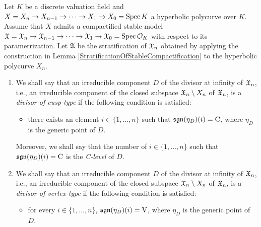 \begin{defn}
  Let $K$ be a discrete valuation field and $X = X_n \to X_{n - 1} \to \cdots \to X_1 \to X_0 = \mathrm{Spec} \, K$ a hyperbolic polycurve over $K$. Assume that $X$ admits a compactified stable model $\mathfrak{X} = \mathfrak{X}_n \to \mathfrak{X}_{n - 1} \to \cdots \to \mathfrak{X}_1 \to \mathfrak{X}_0 = \mathrm{Spec} \, \mathcal{O}_K$ with respect to its parametrization. Let $\mathfrak{A}$ be the stratification of $\mathfrak{X}_n$ obtained by applying the construction in Lemma \ref{StratificationOfStableCompactification} to the hyperbolic polycurve $X_n$.
  \begin{enumerate}
    \item We shall say that an irreducible component $D$ of the divisor at infinity of $\mathfrak{X}_n$, i.e., an irreducible component of the closed subspace $\mathfrak{X}_n \setminus X_n$ of $\mathfrak{X}_n$, is a \emph{divisor of cusp-type} if the following condition is satisfied:
    \begin{itemize}
      \item there exists an element $i \in \{1, \ldots, n\}$ such that $\mathfrak{sgn}(\eta_D)(i) = \mathrm{C}$, where $\eta_D$ is the generic point of $D$.
    \end{itemize}
    Moreover, we shall say that the number of $i \in \{1, \ldots, n\}$ such that $\mathfrak{sgn}(\eta_D)(i) = \mathrm{C}$ is the \emph{C-level} of $D$.
    \item We shall say that an irreducible component $D$ of the divisor at infinity of $\mathfrak{X}_n$, i.e., an irreducible component of the closed subspace $\mathfrak{X}_n \setminus X_n$ of $\mathfrak{X}_n$, is a \emph{divisor of vertex-type} if the following condition is satisfied:
    \begin{itemize}
      \item for every $i \in \{1, \ldots, n\}$, $\mathfrak{sgn}(\eta_D)(i) = \mathrm{V}$, where $\eta_D$ is the generic point of $D$.
    \end{itemize}
  \end{enumerate}
\end{defn}

